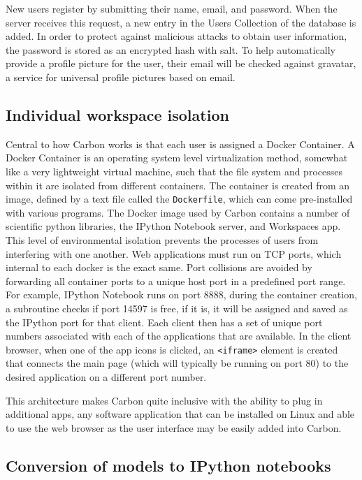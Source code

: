 New users register by submitting their name, email, and password.
When the server receives this request, a new entry in the Users Collection of the database is added.
In order to protect against malicious attacks to obtain user information, the password is stored as an encrypted hash with salt. \autocite{bellovin1993augmented}
To help automatically provide a profile picture for the user, their email will be checked against gravatar, a service for universal profile pictures based on email.

\subsection{Individual workspace isolation}
\label{sec:docker}

Central to how Carbon works is that each user is assigned a Docker Container.
A Docker Container is an operating system level virtualization method, somewhat like a very lightweight virtual machine, such that the file system and processes within it are isolated from different containers.
The container is created from an image, defined by a text file called the \texttt{Dockerfile}, which can come pre-installed with various programs.
The Docker image used by Carbon contains a number of scientific python libraries, the IPython Notebook server, and Workspaces app.
This level of environmental isolation prevents the processes of users from interfering with one another.
Web applications must run on TCP ports, which internal to each docker is the exact same.
Port collisions are avoided by forwarding all container ports to a unique host port in a predefined port range.
For example, IPython Notebook runs on port 8888, during the container creation, a subroutine checks if port 14597 is free, if it is, it will be assigned and saved as the IPython port for that client.
Each client then has a set of unique port numbers associated with each of the applications that are available.
In the client browser, when one of the app icons is clicked, an \texttt{<iframe>} element is created that connects the main page (which will typically be running on port 80) to the desired application on a different port number.

This architecture makes Carbon quite inclusive with the ability to plug in additional apps, any software application that can be installed on Linux and able to use the web browser as the user interface may be easily added into Carbon.

\subsection{Conversion of models to IPython notebooks}

